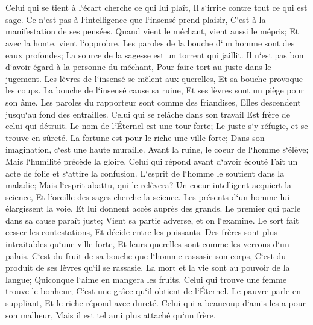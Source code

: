 \chapter{}

\verse Celui qui se tient à l`écart cherche ce qui lui plaît, Il s`irrite contre tout ce qui est sage. 
\verse Ce n`est pas à l`intelligence que l`insensé prend plaisir, C`est à la manifestation de ses pensées. 
\verse Quand vient le méchant, vient aussi le mépris; Et avec la honte, vient l`opprobre. 
\verse Les paroles de la bouche d`un homme sont des eaux profondes; La source de la sagesse est un torrent qui jaillit. 
\verse Il n`est pas bon d`avoir égard à la personne du méchant, Pour faire tort au juste dans le jugement. 
\verse Les lèvres de l`insensé se mêlent aux querelles, Et sa bouche provoque les coups. 
\verse La bouche de l`insensé cause sa ruine, Et ses lèvres sont un piège pour son âme. 
\verse Les paroles du rapporteur sont comme des friandises, Elles descendent jusqu`au fond des entrailles. 
\verse Celui qui se relâche dans son travail Est frère de celui qui détruit. 
\verse Le nom de l`Éternel est une tour forte; Le juste s`y réfugie, et se trouve en sûreté. 
\verse La fortune est pour le riche une ville forte; Dans son imagination, c`est une haute muraille. 
\verse Avant la ruine, le coeur de l`homme s`élève; Mais l`humilité précède la gloire. 
\verse Celui qui répond avant d`avoir écouté Fait un acte de folie et s`attire la confusion. 
\verse L`esprit de l`homme le soutient dans la maladie; Mais l`esprit abattu, qui le relèvera? 
\verse Un coeur intelligent acquiert la science, Et l`oreille des sages cherche la science. 
\verse Les présents d`un homme lui élargissent la voie, Et lui donnent accès auprès des grands. 
\verse Le premier qui parle dans sa cause paraît juste; Vient sa partie adverse, et on l`examine. 
\verse Le sort fait cesser les contestations, Et décide entre les puissants. 
\verse Des frères sont plus intraitables qu`une ville forte, Et leurs querelles sont comme les verrous d`un palais. 
\verse C`est du fruit de sa bouche que l`homme rassasie son corps, C`est du produit de ses lèvres qu`il se rassasie. 
\verse La mort et la vie sont au pouvoir de la langue; Quiconque l`aime en mangera les fruits. 
\verse Celui qui trouve une femme trouve le bonheur; C`est une grâce qu`il obtient de l`Éternel. 
\verse Le pauvre parle en suppliant, Et le riche répond avec dureté. 
\verse Celui qui a beaucoup d`amis les a pour son malheur, Mais il est tel ami plus attaché qu`un frère. 

